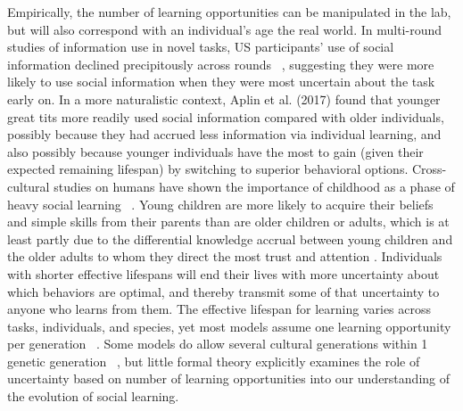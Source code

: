 \documentclass[letterpaper,11.5pt]{scrartcl}
\newcommand{\mt}[1]{{\textcolor{myorange} {({\tiny MT:} #1)}}}
\newcommand{\ps}[1]{{\textcolor{mygreen} {({\tiny PS:} #1)}}}
\begin{document}
Empirically, the number of learning opportunities can be manipulated in the lab, but will also correspond with an individual's age the real world. In multi-round studies of information use in novel tasks, US participants' use of social information declined precipitously across rounds ~\cite{McElreath2005}, suggesting they were more likely to use social information when they were most uncertain about the task early on. In a more naturalistic context, Aplin et al. (2017) \nocite{Aplin2017} found that younger great tits more readily used social information compared with older individuals, possibly because they had accrued less information via individual learning, and also possibly because younger individuals have the most to gain (given their expected remaining lifespan) by switching to superior behavioral options. 
Cross-cultural studies on humans have shown the importance of childhood as a phase of heavy social learning ~\cite{Reyes2016}. Young children are more likely to acquire their beliefs and simple skills from their parents than are older children or adults, which is at least partly due to the differential knowledge accrual between young children and the older adults to whom they direct the most trust and attention \cite{kline2013teaching}.
Individuals with shorter effective lifespans will end their lives with more uncertainty about which behaviors are optimal, and thereby transmit some of that uncertainty to anyone who learns from them. The effective lifespan for learning varies across tasks, individuals, and species, yet most models assume one learning opportunity per generation ~\cite{Feldman1996,Henrich1998, perreault2012bayesian}. Some models do allow several cultural generations within 1 genetic generation ~\cite{Enquist2007}, but little formal theory explicitly examines the role of uncertainty based on number of learning opportunities into our understanding of the evolution of social learning. 

\end{document}
